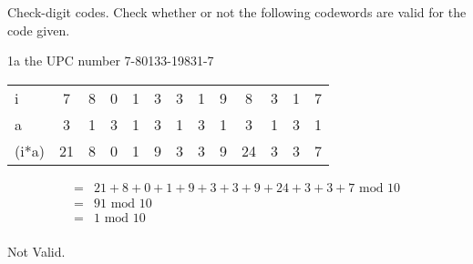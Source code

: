 \begin{question}{1}
Check-digit codes. Check whether or not the following codewords are valid for the
code given.
\end{question}


\begin{question}{1a} %
the UPC number 7-80133-19831-7

\begin{tabular}{l|cccccccccccc}
\hline
i     & 7  & 8 & 0 & 1 & 3 & 3 & 1 & 9 & 8 & 3 & 1 & 7 \\
a     & 3  & 1 & 3 & 1 & 3 & 1 & 3 & 1 & 3 & 1 & 3 & 1\\
\hline
(i*a) & 21 & 8 & 0 & 1 & 9 & 3 & 3 & 9 & 24 & 3 & 3 & 7
\end{tabular}

\begin{align*}
=&21 + 8 + 0 + 1 + 9 + 3 + 3 + 9 + 24 + 3 + 3 + 7\textrm{ mod } 10\\
=&91 \textrm{ mod } 10\\
=&1 \textrm{ mod } 10\\
\end{align*}

Not Valid.
\end{question}


